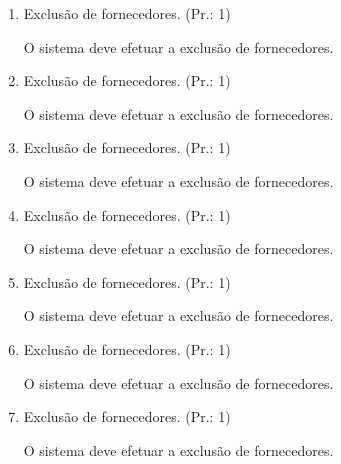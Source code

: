\begin{enumerate}[
	label=RF\arabic{*}, 
	ref=(RF\arabic{*}),
	leftmargin=1.5em,
	itemindent=4.5em]
	

\item Exclusão de fornecedores. (Pr.: 1)\par
O sistema deve efetuar a exclusão de fornecedores.\par

\item Exclusão de fornecedores. (Pr.: 1)\par
O sistema deve efetuar a exclusão de fornecedores.\par

\item Exclusão de fornecedores. (Pr.: 1)\par
O sistema deve efetuar a exclusão de fornecedores.\par

\item Exclusão de fornecedores. (Pr.: 1)\par
O sistema deve efetuar a exclusão de fornecedores.\par

\item Exclusão de fornecedores. (Pr.: 1)\par
O sistema deve efetuar a exclusão de fornecedores.\par

\item Exclusão de fornecedores. (Pr.: 1)\par
O sistema deve efetuar a exclusão de fornecedores.\par

\item Exclusão de fornecedores. (Pr.: 1)\par
O sistema deve efetuar a exclusão de fornecedores.\par


\end{enumerate}
